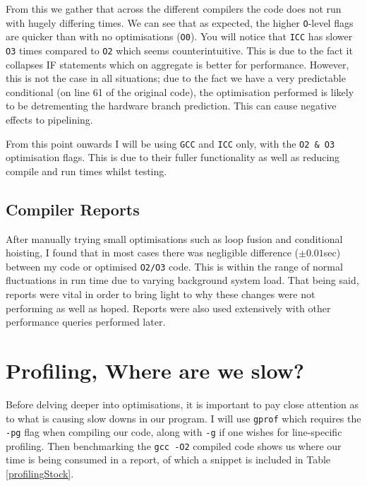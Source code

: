 \documentclass[10pt,twocolumn,a4paper]{article}
\begin{document}
From this we gather that across the different compilers the code does not run with hugely differing times. We can see that as expected, the higher \texttt{O}-level flags are quicker than with no optimisations (\texttt{O0}). You will notice that \texttt{ICC} has slower \texttt{O3} times compared to \texttt{O2} which seems counterintuitive. This is due to the fact it collapses IF statements which on aggregate is better for performance. However, this is not the case in all situations; due to the fact we have a very predictable conditional (on line 61 of the original code), the optimisation performed is likely to be detrementing the hardware branch prediction. This can cause negative effects to pipelining. \par

From this point onwards I will be using \texttt{GCC} and \texttt{ICC} only, with the \texttt{O2 \& O3} optimisation flags. This is due to their fuller functionality as well as reducing compile and run times whilst testing.

\subsection{Compiler Reports}
After manually trying small optimisations such as loop fusion and conditional hoisting, I found that in most cases there was negligible difference ($\pm0.01$sec) between my code or optimised \texttt{O2/O3} code. This is within the range of normal fluctuations in run time due to varying background system load. That being said, reports were vital in order to bring light to why these changes were not performing as well as hoped. Reports were also used extensively with other performance queries performed later.





\section{Profiling, Where are we slow?}
Before delving deeper into optimisations, it is important to pay close attention as to what is causing slow downs in our program. I will use \texttt{gprof} which requires the \texttt{-pg} flag when compiling our code, along with \texttt{-g} if one wishes for line-specific profiling. Then benchmarking the \texttt{gcc -O2} compiled code shows us where our time is being consumed in a report, of which a snippet is included in Table \ref{profilingStock}. \par
\end{document}
